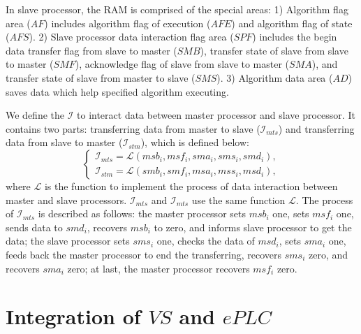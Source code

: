 \documentclass[journal,UTF8]{IEEEtran}
\begin{document}
In slave processor, the RAM is comprised of the special areas: 1) Algorithm flag area ($AF$) includes algorithm flag of execution ($AFE$) and algorithm flag of state ($AFS$). 2) Slave processor data interaction flag area ($SPF$) includes the begin data transfer flag from slave to master ($SMB$), transfer state of slave from slave to master ($SMF$), acknowledge flag of slave from slave to master ($SMA$), and transfer state of slave from master to slave ($SMS$). 3) Algorithm data area ($AD$) saves data which help specified algorithm executing.

 We define the $\mathcal{I}$ to interact data between master processor and slave processor. It contains two parts: transferring data from master to slave ($\mathcal{I}_{mts}$) and transferring data from slave to master ($\mathcal{I}_{stm}$), which is defined below:
 \begin{equation}
 \left\{
 \begin{array}{l}
 \mathcal{I}_{mts} = \mathcal{L} (msb_i,msf_i,sma_i,sms_i,smd_i),\\
 \mathcal{I}_{stm} = \mathcal{L} (smb_i,smf_i,msa_i,mss_i,msd_i),
 \end{array}
 \right.
 \end{equation}
 where $\mathcal{L}$ is the function to implement the process of data interaction between master and slave processors. $\mathcal{I}_{mts}$ and $\mathcal{I}_{mts}$ use the same function $\mathcal{L}$. The process of $\mathcal{I}_{mts}$ is described as follows: the master processor sets $msb_i$ one, sets $msf_i$ one, sends data to $smd_i$, recovers $msb_i$ to zero, and informs slave processor to get the data; the slave processor sets $sms_i$ one, checks the data of $msd_i$, sets $sma_i$ one, feeds back the master processor to end the transferring, recovers $sms_i$ zero, and recovers $sma_i$ zero; at last, the master processor recovers $msf_i$ zero.     
 

\section{Integration of $VS$ and $ePLC$}
\label{Integration}
\end{document}
